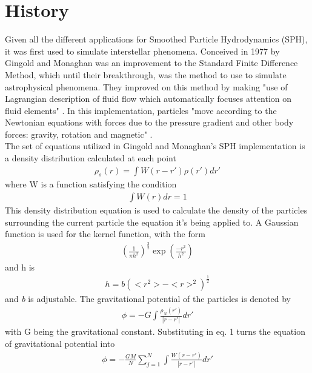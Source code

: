 \documentclass{sigchi}
\begin{document}
\section{History}
%
\hspace{6 pt} Given all the different applications for Smoothed Particle Hydrodynamics (SPH),
it was first used to simulate interstellar phenomena. Conceived in 1977 by Gingold and 
Monaghan was an improvement to the Standard Finite Difference Method, which until their 
breakthrough, was the method to use to simulate astrophysical phenomena. They improved 
on this method by making "use of Lagrangian description of fluid flow which automatically 
focuses attention on fluid elements" \cite{sphastrophysics}. In this implementation, particles 
"move according to the Newtonian equations with forces due to the pressure gradient and 
other body forces: gravity, rotation and magnetic" \cite{sphastrophysics}.
\\
\hspace*{6 pt} The set of equations utilized in Gingold and Monaghan's SPH implementation 
is a density distribution calculated at each point
\begin{align}
	\rho_s(r) = \int W(r - r') \rho(r') dr'
\end{align}
where W is a function satisfying the condition
\begin{align}
\int W(r) dr = 1
\end{align}
\hspace*{6 pt} This density distribution equation is used to calculate the density of the 
particles surrounding the current particle the equation it's being applied to.
\hspace*{6 pt} A Gaussian function is used for the kernel function, with the form
\begin{align}
(\frac{1}{\pi h^2})^\frac{3}{2}  \exp{(\frac{-r^2}{h^2})}
\end{align}
and h is
\begin{align}
h = b(<r^2> - <r>^2)^\frac{1}{2}
\end{align}
and \textit{b} is adjustable.
\hspace*{6 pt} The gravitational potential of the particles is denoted by
\begin{align}
\phi = - G \int \frac{\rho_N(r')}{|r - r'|} dr'
\end{align}
with G being the gravitational constant. Substituting in eq. 1 turns the equation 
of gravitational potential into
\begin{align}
\phi = - \frac{GM}{N} \sum_{j=1}^N \int \frac{W(r - r')}{|r - r'|} dr'
\end{align}
\end{document}
